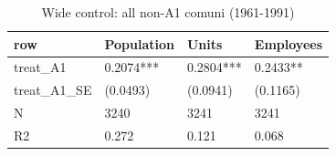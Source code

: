 \begin{table}

\caption{Wide control: all non-A1 comuni (1961-1991)}
\centering
\begin{tabular}[t]{llll}
\toprule
row & Population & Units & Employees\\
\midrule
treat\_A1 & 0.2074*** & 0.2804*** & 0.2433**\\
treat\_A1\_SE & (0.0493) & (0.0941) & (0.1165)\\
N & 3240 & 3241 & 3241\\
R2 & 0.272 & 0.121 & 0.068\\
\bottomrule
\end{tabular}
\end{table}

